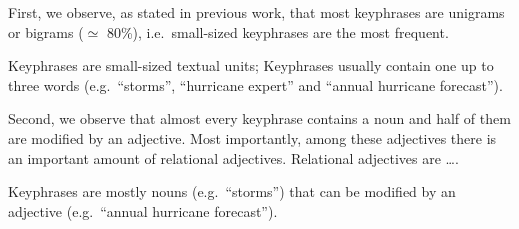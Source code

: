     First, we observe, as stated in previous work, that most keyphrases are
    unigrams or bigrams ($\simeq$ 80\%), i.e.~small-sized keyphrases are the
    most frequent.
    
    \begin{property}\label{prop:informativity}
      Keyphrases are small-sized textual units; Keyphrases usually contain one
      up to three words (e.g.~``storms'', ``hurricane expert'' and ``annual
      hurricane forecast'').
    \end{property}

    Second, we observe that almost every keyphrase contains a noun and half of
    them are modified by an adjective. Most importantly, among these adjectives
    there is an important amount of relational adjectives. Relational adjectives
    are \dots. 

    \begin{property}\label{prop:noun_phrases}
      Keyphrases are mostly nouns (e.g.~``storms'') that can be modified by an
      adjective (e.g.~``annual hurricane forecast'').
    \end{property}

